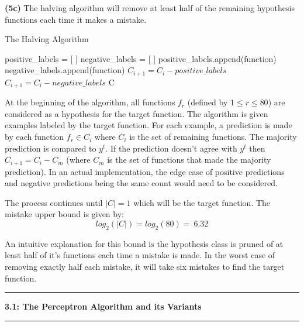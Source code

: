 \documentclass[11pt]{article}
\newcommand\question[2]{\vspace{.25in}\hrule\textbf{#1: #2}\vspace{.5em}\hrule\vspace{.10in}}
\renewcommand\part[1]{\vspace{.10in}\textbf{(#1)}}
\begin{document}
\part{5c} The halving algorithm will remove at least half of the remaining hypothesis functions each time it makes a mistake.

\begin{algorithm}[H]
\caption{The Halving Algorithm}
\label{CHalgorithm}
\begin{algorithmic}[1]

\State positive\_labels = [ ]
\State negative\_labels = [ ]
\State positive\_labels.append(function)
\Else
\State negative\_labels.append(function)
\EndIf
\EndFor
{}
\State $C_{i+1} = C_i - positive\_labels$
\EndIf
{}
\State $C_{i+1} = C_i - negative\_labels$
\EndIf
\EndFor
\EndWhile
\State
\Return C
\EndProcedure
\end{algorithmic}
\end{algorithm}

At the beginning of the algorithm, all functions $f_r$ (defined by $1 \leq r \leq 80$) are considered as a hypothesis for the target function. The algorithm is given examples labeled by the target function. For each example, a prediction is made by each function $f_r \in C_i$ where $C_i$ is the set of remaining functions. The majority prediction is compared to $y^t$. If the prediction doesn't agree with $y^t$ then $C_{i+1} = C_{i} - C_{m}$ (where $C_m$ is the set of functions that made the majority prediction). In an actual implementation, the edge case of positive predictions and negative predictions being the same count would need to be considered.

The process continues until $|C| = 1$ which will be the target function. The mistake upper bound is given by:
$$log_2(|C|) = log_2(80) = ~6.32$$

An intuitive explanation for this bound is the hypothesis class is pruned of at least half of it's functions each time a mistake is made. In the worst case of removing exactly half each mistake, it will take six mistakes to find the target function.


\question{3.1}{The Perceptron Algorithm and its Variants}
\end{document}
